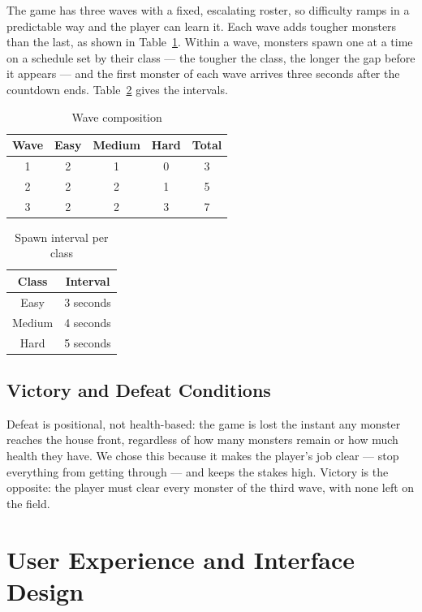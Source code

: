\documentclass[12pt,a4paper]{report}
\begin{document}
The game has three waves with a fixed, escalating roster, so difficulty ramps in
a predictable way and the player can learn it. Each wave adds tougher monsters
than the last, as shown in Table~\ref{tab:waves}. Within a wave, monsters spawn
one at a time on a schedule set by their class --- the tougher the class, the
longer the gap before it appears --- and the first monster of each wave arrives
three seconds after the countdown ends. Table~\ref{tab:spawn} gives the
intervals.

\begin{table}[htbp]
\centering
\caption{Wave composition}
\label{tab:waves}
\begin{tabular}{|c|c|c|c|c|}
\hline
Wave & Easy & Medium & Hard & Total \\
\hline
1 & 2 & 1 & 0 & 3 \\
\hline
2 & 2 & 2 & 1 & 5 \\
\hline
3 & 2 & 2 & 3 & 7 \\
\hline
\end{tabular}
\end{table}

\begin{table}[htbp]
\centering
\caption{Spawn interval per class}
\label{tab:spawn}
\begin{tabular}{|c|c|}
\hline
Class & Interval \\
\hline
Easy   & 3 seconds \\
\hline
Medium & 4 seconds \\
\hline
Hard   & 5 seconds \\
\hline
\end{tabular}
\end{table}

\subsection{Victory and Defeat Conditions}

Defeat is positional, not health-based: the game is lost the instant any monster
reaches the house front, regardless of how many monsters remain or how much
health they have. We chose this because it makes the player's job clear --- stop
everything from getting through --- and keeps the stakes high. Victory is the
opposite: the player must clear every monster of the third wave, with none left
on the field.

\section{User Experience and Interface Design}
\end{document}
